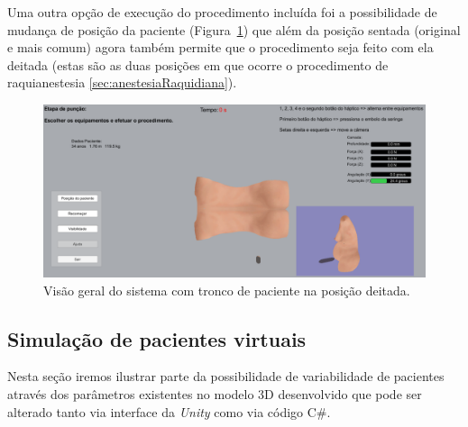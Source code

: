 Uma outra opção de execução do procedimento incluída foi a possibilidade de mudança de posição da paciente (Figura~\ref{fig:posicaoDeitada}) que além da posição sentada (original e mais comum) agora também permite que o procedimento seja feito com ela deitada (estas são as duas posições em que ocorre o procedimento de raquianestesia \ref{sec:anestesiaRaquidiana}).

\begin{figure}[ht!]
    \centering
    \includegraphics[width=0.9\linewidth]{capitulos/figuras/sistema posicao deitada.png} 
    \caption{Visão geral do sistema com tronco de paciente na posição deitada.}
    \label{fig:posicaoDeitada}
\end{figure}

\subsection {Simulação de pacientes virtuais}

Nesta seção iremos ilustrar parte da possibilidade de variabilidade de pacientes através dos parâmetros existentes no modelo 3D desenvolvido que pode ser alterado tanto via interface da \textit{Unity} como via código C\#. 

